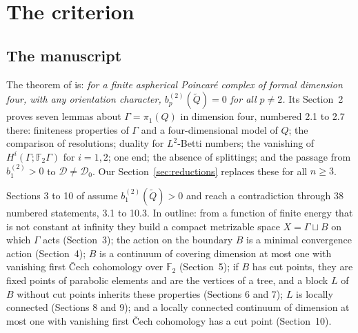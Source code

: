 \documentclass[11pt,a4paper]{article}
\theoremstyle{definition}
\theoremstyle{remark}
\newcommand{\F}{\mathbb{F}}
\newcommand{\Gam}{\Gamma}
\newcommand{\bt}[1]{b^{(2)}_{#1}}
\newcommand{\Dsp}{\mathcal{D}}
\begin{document}
\section{The criterion}\label{sec:criterion}

\subsection{The manuscript}
The theorem of \cite{O} is: \emph{for a finite aspherical Poincar\'e complex of
formal dimension four, with any orientation character, $\bt{p}(\widetilde Q)=0$
for all $p\ne2$.} Its Section~2 proves seven lemmas about $\Gam=\pi_1(Q)$ in
dimension four, numbered 2.1 to 2.7 there: finiteness properties of $\Gam$ and a four-dimensional model of $Q$; the
comparison of resolutions; duality for $L^2$-Betti numbers; the vanishing of
$H^i(\Gam;\F_2\Gam)$ for $i=1,2$; one end; the absence of splittings; and the
passage from $\bt{1}>0$ to $\Dsp\ne\Dsp_0$. Our Section~\ref{sec:reductions} replaces these for all $n\ge3$.

Sections 3 to 10 of \cite{O} assume $\bt{1}(\widetilde Q)>0$ and reach a
contradiction through 38 numbered statements, 3.1 to 10.3. In outline: from a
function of finite energy that is not constant at infinity they build a compact
metrizable space $X=\Gam\sqcup B$ on which $\Gam$ acts (Section~3); the action on the
boundary $B$ is a minimal convergence action (Section~4); $B$ is a continuum of
covering dimension at most one with vanishing first \v{C}ech cohomology over
$\F_2$ (Section~5); if $B$ has cut points, they are fixed points of parabolic
elements and are the vertices of a tree, and a block $L$ of $B$ without cut points
inherits these properties (Sections 6 and 7); $L$ is locally connected (Sections 8
and 9); and a locally connected continuum of dimension at most one with vanishing
first \v{C}ech cohomology has a cut point (Section~10).
\end{document}
